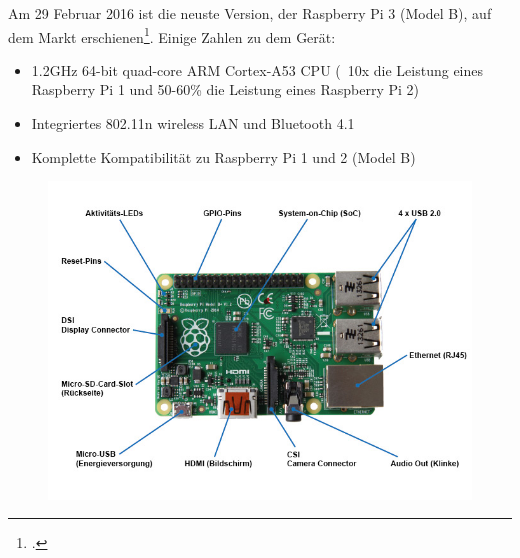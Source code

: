 Am 29 Februar 2016 ist die neuste Version, der Raspberry Pi 3 (Model B), auf dem Markt erschienen\footcite{Raspberry_Pi_3_2016-04-24}. Einige Zahlen zu dem Gerät:

\begin{itemize}
\item 1.2GHz 64-bit quad-core ARM Cortex-A53 CPU (~10x die Leistung eines Raspberry Pi 1 und 50-60\% die Leistung eines Raspberry Pi 2)
\item Integriertes 802.11n wireless LAN und Bluetooth 4.1
\item Komplette Kompatibilität zu Raspberry Pi 1 und 2 (Model B)
\end{itemize} 


\begin{figure}[H]
  \centering
  \includegraphics[width=13cm]{./images/RaspberryPi2ModelBPlusOverview}
\end{figure}

